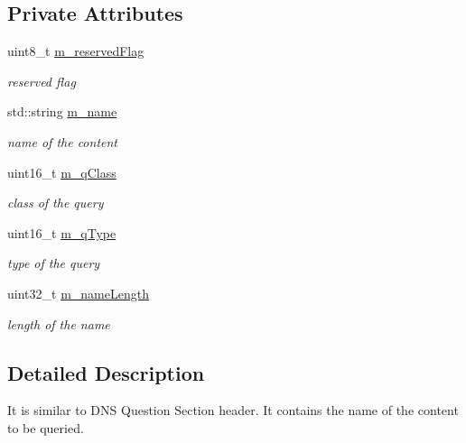 \subsection*{Private Attributes}
\begin{DoxyCompactItemize}
\item 
uint8\-\_\-t \hyperlink{classns3_1_1DnsPlusQuestionHeader_a84e44f8fa45c27b13bd7a80ab4d3c648}{m\-\_\-reserved\-Flag}
\begin{DoxyCompactList}\small\item\em reserved flag \end{DoxyCompactList}\item 
std\-::string \hyperlink{classns3_1_1DnsPlusQuestionHeader_a37b7ee88822487ebb7515c4e6d711d9a}{m\-\_\-name}
\begin{DoxyCompactList}\small\item\em name of the content \end{DoxyCompactList}\item 
uint16\-\_\-t \hyperlink{classns3_1_1DnsPlusQuestionHeader_a3bc213161b96f292d6e3d0dab3d42cba}{m\-\_\-q\-Class}
\begin{DoxyCompactList}\small\item\em class of the query \end{DoxyCompactList}\item 
uint16\-\_\-t \hyperlink{classns3_1_1DnsPlusQuestionHeader_a9ec3c28da5e22b33bccb1406ba053876}{m\-\_\-q\-Type}
\begin{DoxyCompactList}\small\item\em type of the query \end{DoxyCompactList}\item 
uint32\-\_\-t \hyperlink{classns3_1_1DnsPlusQuestionHeader_ad17e8994480e0dc6c79ae59a0e4a80c6}{m\-\_\-name\-Length}
\begin{DoxyCompactList}\small\item\em length of the name \end{DoxyCompactList}\end{DoxyCompactItemize}


\subsection{Detailed Description}
It is similar to D\-N\-S Question Section header. It contains the name of the content to be queried. 


